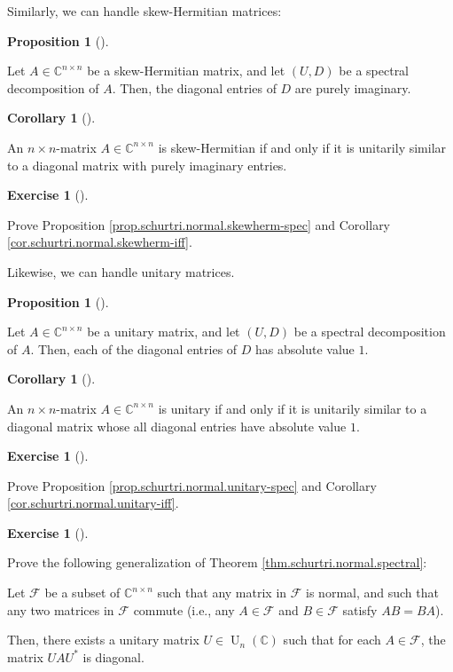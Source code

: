 \documentclass[numbers=enddot,12pt,final,onecolumn,notitlepage]{scrartcl}%
\newcounter{exer}
\numberwithin{exer}{subsection}
\theoremstyle{definition}
\newtheorem{prop}[theo]{Proposition}
\newenvironment{proposition}[1][]
{\begin{prop}[#1]\begin{leftbar}}
{\end{leftbar}\end{prop}}
\newtheorem{coro}[theo]{Corollary}
\newenvironment{corollary}[1][]
{\begin{coro}[#1]\begin{leftbar}}
{\end{leftbar}\end{coro}}
\newtheorem{exmp}[exer]{Exercise}
\newenvironment{exercise}[1][]
{\begin{exmp}[#1]\begin{leftbar}}
{\end{leftbar}\end{exmp}}
\begin{document}
Similarly, we can handle skew-Hermitian matrices:

\begin{proposition}
\label{prop.schurtri.normal.skewherm-spec}Let $A\in\mathbb{C}^{n\times n}$ be
a skew-Hermitian matrix, and let $\left(  U,D\right)  $ be a spectral
decomposition of $A$. Then, the diagonal entries of $D$ are purely imaginary.
\end{proposition}

\begin{corollary}
\label{cor.schurtri.normal.skewherm-iff}An $n\times n$-matrix $A\in
\mathbb{C}^{n\times n}$ is skew-Hermitian if and only if it is unitarily
similar to a diagonal matrix with purely imaginary entries.
\end{corollary}

\begin{exercise}
\label{exe.schurtri.normal.skewherm} Prove Proposition
\ref{prop.schurtri.normal.skewherm-spec} and Corollary
\ref{cor.schurtri.normal.skewherm-iff}.
\end{exercise}

Likewise, we can handle unitary matrices.

\begin{proposition}
\label{prop.schurtri.normal.unitary-spec}Let $A\in\mathbb{C}^{n\times n}$ be a
unitary matrix, and let $\left(  U,D\right)  $ be a spectral decomposition of
$A$. Then, each of the diagonal entries of $D$ has absolute value $1$.
\end{proposition}

\begin{corollary}
\label{cor.schurtri.normal.unitary-iff}An $n\times n$-matrix $A\in
\mathbb{C}^{n\times n}$ is unitary if and only if it is unitarily similar to a
diagonal matrix whose all diagonal entries have absolute value $1$.
\end{corollary}

\begin{exercise}
\label{exe.schurtri.normal.unitary} Prove Proposition
\ref{prop.schurtri.normal.unitary-spec} and Corollary
\ref{cor.schurtri.normal.unitary-iff}.
\end{exercise}

\begin{exercise}
 Prove the following generalization of Theorem
\ref{thm.schurtri.normal.spectral}:

Let $\mathcal{F}$ be a subset of $\mathbb{C}^{n\times n}$ such that any matrix
in $\mathcal{F}$ is normal, and such that any two matrices in $\mathcal{F}$
commute (i.e., any $A\in\mathcal{F}$ and $B\in\mathcal{F}$ satisfy $AB=BA$).

Then, there exists a unitary matrix $U\in\operatorname*{U}\nolimits_{n}\left(
\mathbb{C}\right)  $ such that for each $A\in\mathcal{F}$, the matrix
$UAU^{\ast}$ is diagonal.
\end{exercise}
\end{document}
